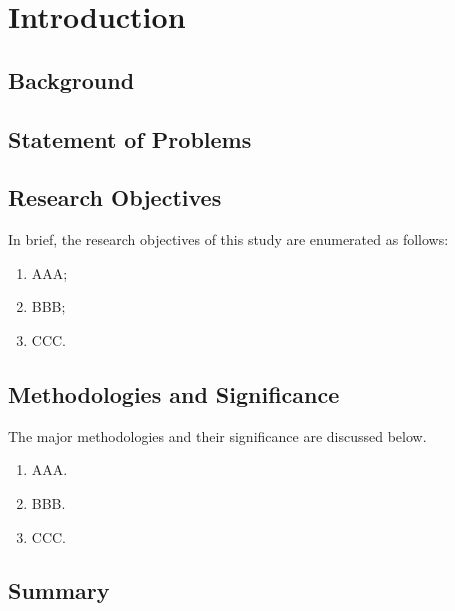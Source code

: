 \chapter{Introduction}
\label{ch1:Introduction}

\section{Background}
\label{ch1:sec:Background}

\section{Statement of Problems}
\label{ch1:sec:StatementofProblems}

\section{Research Objectives}
\label{ch1:sec:ResearchObjectives}

In brief, the research objectives of this study are enumerated as follows:
\begin{enumerate}
    \item AAA;
    
    \item BBB;
    
    \item CCC.
\end{enumerate}

\section{Methodologies and Significance}
\label{ch1:sec:MethodologiesandSignificance}

The major methodologies and their significance are discussed below.
\begin{enumerate}
    \item AAA.

    \item BBB.

    \item CCC.
\end{enumerate}


\section{Summary}
\label{ch1:sec:Summary}
